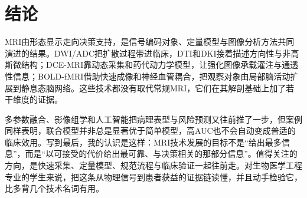 \section{结论}

MRI由形态显示走向决策支持，是信号编码对象、定量模型与图像分析方法共同演进的结果。DWI/ADC把扩散过程带进临床，DTI和DKI接着描述方向性与非高斯微结构；DCE-MRI靠动态采集和药代动力学模型，让强化图像承载灌注与通透性信息；BOLD-fMRI借助快速成像和神经血管耦合，把观察对象由局部脑活动扩展到静息态脑网络。这些技术都没有取代常规MRI，它们在其解剖基础上加了若干维度的证据。

多参数融合、影像组学和人工智能把病理表型与风险预测又往前推了一步，但案例同样表明，联合模型并非总是显著优于简单模型，高AUC也不会自动变成普适的临床效用。写到最后，我的认识是这样：MRI技术发展的目标不是“给出最多信息”，而是“以可接受的代价给出最可靠、与决策相关的那部分信息”。值得关注的方向，是快速采集、定量模型、规范流程与临床验证一起往前走。对生物医学工程专业的学生来说，把这条从物理信号到患者获益的证据链读懂，并且动手检验它，比多背几个技术名词有用。
